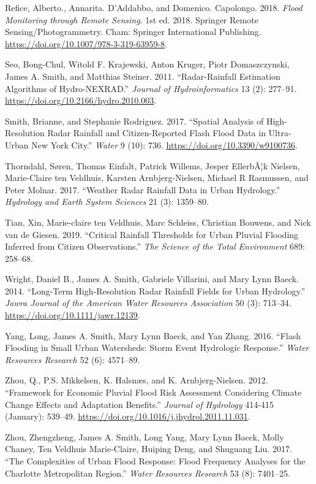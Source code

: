 \documentclass[11pt]{article}
\begin{document}
\begin{hangparas}{1.5em}{1}
\hypertarget{citeproc_bib_item_18}{Refice, Alberto., Annarita. D’Addabbo, and Domenico. Capolongo. 2018. \textit{Flood Monitoring through Remote Sensing}. 1st ed. 2018. Springer Remote Sensing/Photogrammetry. Cham: Springer International Publishing. \url{https://doi.org/10.1007/978-3-319-63959-8}.}

\hypertarget{citeproc_bib_item_19}{Seo, Bong-Chul, Witold F. Krajewski, Anton Kruger, Piotr Domaszczynski, James A. Smith, and Matthias Steiner. 2011. “Radar-Rainfall Estimation Algorithms of Hydro-NEXRAD.” \textit{Journal of Hydroinformatics} 13 (2): 277–91. \url{https://doi.org/10.2166/hydro.2010.003}.}

\hypertarget{citeproc_bib_item_20}{Smith, Brianne, and Stephanie Rodriguez. 2017. “Spatial Analysis of High-Resolution Radar Rainfall and Citizen-Reported Flash Flood Data in Ultra-Urban New York City.” \textit{Water} 9 (10): 736. \url{https://doi.org/10.3390/w9100736}.}

\hypertarget{citeproc_bib_item_21}{Thorndahl, Søren, Thomas Einfalt, Patrick Willems, Jesper EllerbÃ¦k Nielsen, Marie-Claire ten Veldhuis, Karsten Arnbjerg-Nielsen, Michael R Rasmussen, and Peter Molnar. 2017. “Weather Radar Rainfall Data in Urban Hydrology.” \textit{Hydrology and Earth System Sciences} 21 (3): 1359–80.}

\hypertarget{citeproc_bib_item_22}{Tian, Xin, Marie-claire ten Veldhuis, Marc Schleiss, Christian Bouwens, and Nick van de Giesen. 2019. “Critical Rainfall Thresholds for Urban Pluvial Flooding Inferred from Citizen Observations.” \textit{The Science of the Total Environment} 689: 258–68.}

\hypertarget{citeproc_bib_item_23}{Wright, Daniel B., James A. Smith, Gabriele Villarini, and Mary Lynn Baeck. 2014. “Long‐Term High‐Resolution Radar Rainfall Fields for Urban Hydrology.” \textit{Jawra Journal of the American Water Resources Association} 50 (3): 713–34. \url{https://doi.org/10.1111/jawr.12139}.}

\hypertarget{citeproc_bib_item_24}{Yang, Long, James A. Smith, Mary Lynn Baeck, and Yan Zhang. 2016. “Flash Flooding in Small Urban Watersheds: Storm Event Hydrologic Response.” \textit{Water Resources Research} 52 (6): 4571–89.}

\hypertarget{citeproc_bib_item_25}{Zhou, Q., P.S. Mikkelsen, K. Halsnæs, and K. Arnbjerg-Nielsen. 2012. “Framework for Economic Pluvial Flood Risk Assessment Considering Climate Change Effects and Adaptation Benefits.” \textit{Journal of Hydrology} 414-415 (January): 539–49. \url{https://doi.org/10.1016/j.jhydrol.2011.11.031}.}

\hypertarget{citeproc_bib_item_26}{Zhou, Zhengzheng, James A. Smith, Long Yang, Mary Lynn Baeck, Molly Chaney, Ten Veldhuis Marie‐Claire, Huiping Deng, and Shuguang Liu. 2017. “The Complexities of Urban Flood Response: Flood Frequency Analyses for the Charlotte Metropolitan Region.” \textit{Water Resources Research} 53 (8): 7401–25.}\bigskip
\end{hangparas}
\end{document}
